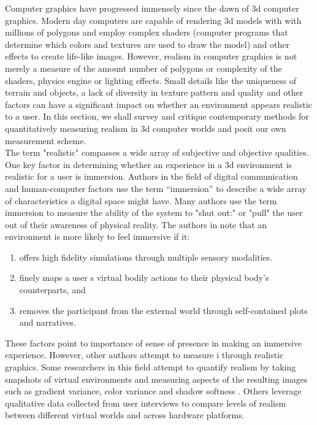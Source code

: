 Computer graphics have progressed immensely since the dawn of 3d computer graphics. Modern day computers are capable of rendering 3d models with with millions of polygons and employ complex shaders (computer programs that determine which colors and textures are used to draw the model) and other effects to create life-like images. However, realism in computer graphics is not merely a measure of the amount number of polygons or complexity of the shaders, physics engine or lighting effects. Small details like the uniqueness of terrain and objects, a lack of diversity in texture pattern and quality and other factors can have a significant impact on whether an environment appears realistic to a user. In this section, we shall survey and critique contemporary methods for quantitatively measuring realism in 3d computer worlds and posit our own measurement scheme. 
\\

The term "realistic" compasses a wide array of subjective and objective qualities. One key factor in determining whether an experience in a 3d environment is realistic for a user is immersion. Authors in the field of digital communication and human-computer factors use the term “immersion” to describe a wide array of characteristics a digital space might have. Many authors use the term immersion to measure the ability of the system to "shut out:" or "pull" the user out of their awareness of physical reality. The authors in \citep{Cummings_2015}
 note that an environment is more likely to feel immersive if it:
 \begin{enumerate}


\item offers high fidelity simulations
through multiple sensory modalities. \item finely maps a user
s virtual bodily
actions to their physical body's counterparts, and \item removes the participant
from the external world through self-contained plots and narratives. 
 \end{enumerate}
These factors point to importance of sense of presence in making an immersive experience. However, other authors attempt to measure i through realistic graphics. Some researchers in this field attempt to quantify realism by taking snapshots of virtual environments and measuring aspects of the resulting images such as gradient variance, color variance and shadow
softness \cite{Wang:2011:RRP:2013879.2014089}. Others leverage qualitative data collected from user interviews to compare levels of realism between different virtual worlds and across hardware platforms.
\\

